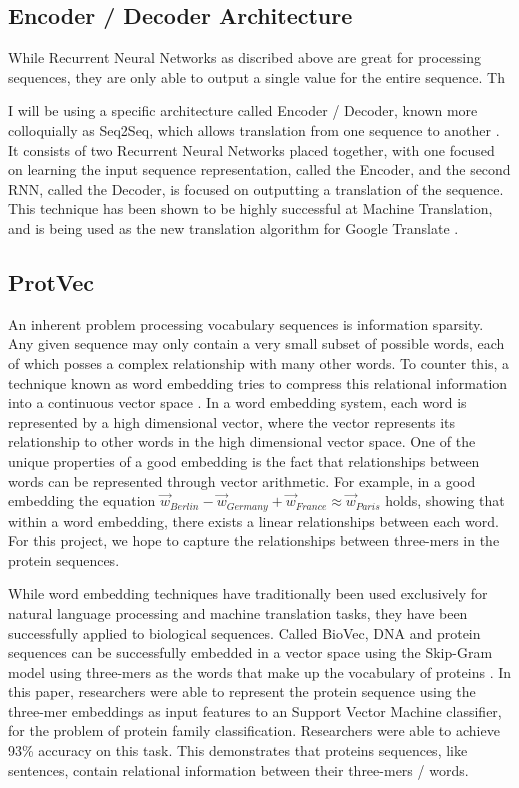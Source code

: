 \documentclass[pageno]{jpaper}
\begin{document}
\subsection{Encoder / Decoder Architecture}
While Recurrent Neural Networks as discribed above are great for processing sequences, they are only able to output a single value for the entire sequence.  Th

I will be using a specific architecture called Encoder / Decoder, known more colloquially as Seq2Seq, which allows translation from one sequence to another \cite{cho:2014}.  It consists of two Recurrent Neural Networks placed together, with one focused on learning the input sequence representation, called the Encoder, and the second RNN, called the Decoder, is focused on outputting a translation of the sequence.  This technique has been shown to be highly successful at Machine Translation, and is being used as the new translation algorithm for Google Translate \cite{wu:2016}.  

\subsection{ProtVec}
An inherent problem processing vocabulary sequences is information sparsity.  Any given sequence may only contain a very small subset of possible words, each of which posses a complex relationship with many other words.  To counter this, a technique known as word embedding tries to compress this relational information into a continuous vector space \cite{mikolov:2013}.  In a word embedding system, each word is represented by a high dimensional vector, where the vector represents its relationship to other words in the high dimensional vector space.  One of the unique properties of a good embedding is the fact that relationships between words can be represented through vector arithmetic.  For example, in a good embedding the equation $\vec{w}_{Berlin} - \vec{w}_{Germany} + \vec{w}_{France} \approx \vec{w}_{Paris}$ holds, showing that within a word embedding, there exists a linear relationships between each word.  For this project, we hope to capture the relationships between three-mers in the protein sequences.

\par
While word embedding techniques have traditionally been used exclusively for natural language processing and machine translation tasks, they have been successfully applied to biological sequences.  Called BioVec, DNA and protein sequences can be successfully embedded in a vector space using the Skip-Gram model using three-mers as the words that make up the vocabulary of proteins \cite{asgari:2015}.  In this paper, researchers were able to represent the protein sequence using the three-mer embeddings as input features to an Support Vector Machine classifier, for the problem of protein family classification.  Researchers were able to achieve 93\% accuracy on this task.  This demonstrates that proteins sequences, like sentences, contain relational information between their three-mers / words.
\end{document}
